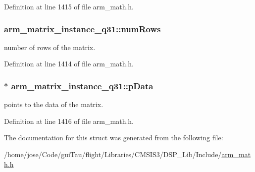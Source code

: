 Definition at line 1415 of file arm\-\_\-math.\-h.

\hypertarget{structarm__matrix__instance__q31_a63bacac158a821c8cfc06088d251598c}{
\subsubsection[{num\-Rows}]{ arm\-\_\-matrix\-\_\-instance\-\_\-q31\-::num\-Rows}}\label{structarm__matrix__instance__q31_a63bacac158a821c8cfc06088d251598c}
number of rows of the matrix. 

Definition at line 1414 of file arm\-\_\-math.\-h.

\hypertarget{structarm__matrix__instance__q31_a09a64267c0579fef086efc9059741e56}{
\subsubsection[{p\-Data}]{$\ast$ arm\-\_\-matrix\-\_\-instance\-\_\-q31\-::p\-Data}}\label{structarm__matrix__instance__q31_a09a64267c0579fef086efc9059741e56}
points to the data of the matrix. 

Definition at line 1416 of file arm\-\_\-math.\-h.



The documentation for this struct was generated from the following file\-:\begin{DoxyCompactItemize}
\item 
/home/jose/\-Code/gui\-Tau/flight/\-Libraries/\-C\-M\-S\-I\-S3/\-D\-S\-P\-\_\-\-Lib/\-Include/\hyperlink{arm__math_8h}{arm\-\_\-math.\-h}\end{DoxyCompactItemize}
